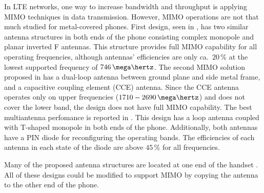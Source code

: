 In LTE networks, one way to increase bandwidth and throughput is applying MIMO techniques in data transmission. However, MIMO operations are not that much studied for metal-covered phones. First design, seen in \cite{son_wideband_mimo}, has two similar antenna structures in both ends of the phone consisting complex monopole and planar inverted F antennas. This structure provides full MIMO capability for all operating frequencies, although antennas' efficiencies are only ca.\ $20\,\%$ at the lowest supported frequency of $746\,\mega\hertz$. The second MIMO solution proposed in \cite{stanley_lte_mimo} has a dual-loop antenna between ground plane and side metal frame, and a capacitive coupling element (CCE) antenna. Since the CCE antenna operates only on upper frequencies ($1710-2690\,\mega\hertz$) and does not cover the lower band, the design does not have full MIMO capability. The best multiantenna perfomance is reported in \cite{reconf_narrow}. This design has a loop antenna coupled with T-shaped monopole in both ends of the phone. Additionally, both antennas have a PIN diode for reconfiguring the operating bands. The efficiencies of each antenna in each state of the diode are above $45\,\%$ for all frequencies.

Many of the proposed antenna structures are located at one end of the handset \cite{hsu_compact,yuan_slot,hybrid,lee_monopole,valkonen_multifeed,chen_metal_frame,hepta_ifa,chen_compact_lte}. All of these designs could be modified to support MIMO by copying the antenna to the other end of the phone.


